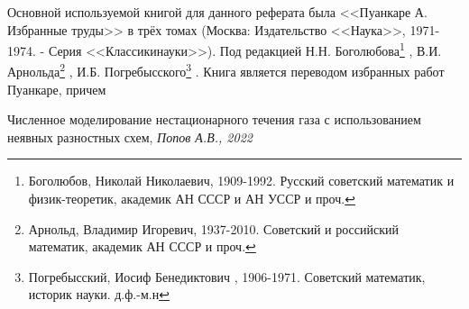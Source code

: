 \documentclass[specialist, subf, href, colorlinks=true, 14pt, times, mtpro, final]{disser}
\theoremstyle{definition}
\begin{document}
	Основной используемой книгой для данного реферата была <<Пуанкаре А. Избранные труды>>  в трёх томах (Москва: Издательство <<Наука>>, 1971-1974. - Серия <<Классикинауки>>). Под редакцией Н.Н. Боголюбова\footnote{Боголюбов, Николай Николаевич, 1909-1992. Русский советский математик и физик-теоретик, академик АН СССР и АН УССР и проч.} , В.И. Арнольда\footnote{Арнольд, Владимир Игоревич, 1937-2010. Советский и российский математик, академик АН СССР и проч.} , И.Б. Погребысского\footnote{Погребысский, Иосиф Бенедиктович
	, 1906-1971. Советский математик, историк науки. д.ф.-м.н} . Книга является переводом избранных работ Пуанкаре, причем
	
	
	\newpage
	\begin{thebibliography}{100}
		 Численное моделирование нестационарного течения газа с использованием неявных разностных схем, \emph{Попов А.В., 2022}
		
	\end{thebibliography}
	
	
\end{document}
